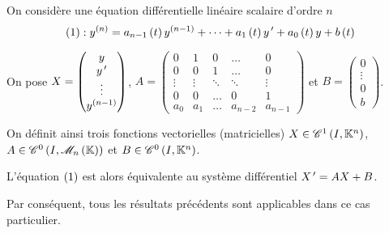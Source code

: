 On considère une équation différentielle linéaire scalaire d'ordre \(n\) \[\left(1\right):y^{\left(n\right)}=a_{n-1}\left(t\right)y^{\left(n-1\right)}+\dots+a_1\left(t\right)y^{\,\prime}+a_0\left(t\right)y+b\left(t\right)\]

On pose \(X=\begin{pmatrix}
y \\
y^{\,\prime} \\
\vdots \\
y^{\left(n-1\right)}
\end{pmatrix}\), \(A=\begin{pmatrix}
0 & 1 & 0 & \dots & 0 \\
0 & 0 & 1 & \dots & 0 \\
\vdots & \vdots & \ddots & \ddots & \vdots \\
0 & 0 & \dots & 0 & 1 \\
a_0 & a_1 & \dots & a_{n-2} & a_{n-1}
\end{pmatrix}\) et \(B=\begin{pmatrix}
0 \\
\vdots \\
0 \\
b
\end{pmatrix}\).

On définit ainsi trois fonctions vectorielles (matricielles) \(X\in\mathscr{C}^{1}\left(I,\mathbb{K}^n\right)\), \(A\in\ensclasse{0}{I}{\M{n}}\) et \(B\in\mathscr{C}^{0}\left(I,\mathbb{K}^n\right)\).

L'équation \(\left(1\right)\) est alors équivalente au système différentiel \(X^{\,\prime}=AX+B\).

Par conséquent, tous les résultats précédents sont applicables dans ce cas particulier.

